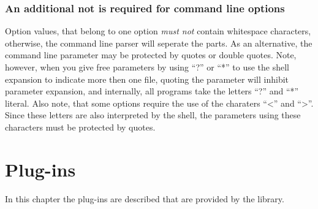\documentclass[english, 10pt, a4paper,headsepline,openany]{scrbook}
\begin{document}
\subsection*{An additional not is required for command line options}

Option values, that belong to one option \emph{must not} contain whitespace characters, otherwise, 
  the command line parser will seperate the parts. 
As an alternative, the command line parameter may be protected by quotes or double quotes. 
Note, however, when you give free parameters by using ``?'' or ``*'' to use the shell expansion to indicate 
  more then one file, quoting the parameter will inhibit parameter expansion, and internally, all programs 
  take the letters ``?'' and ``*'' literal. 
Also note, that some options require the use of the charaters ``<'' and ``>''. 
Since these letters are also interpreted by the shell, the parameters using these characters must be 
  protected by quotes. 



\chapter{Plug-ins}
\label{ch:plugins}

In this chapter the plug-ins are described that are provided by the library.



\cleardoublepage{}

\end{document}
